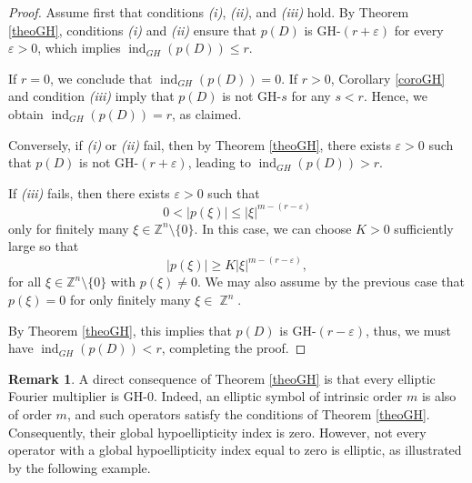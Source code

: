 \documentclass[11pt]{amsart}
\numberwithin{equation}{section}
\theoremstyle{definition}
\newtheorem{remark}[theorem]{Remark}
\DeclareMathOperator{\Z}{\mathbb{Z}}
\begin{document}
	\begin{proof}
		Assume first that conditions {\it (i)}, {\it (ii)}, and {\it (iii)} hold. By Theorem \ref{theoGH}, conditions {\it (i)} and {\it (ii)} ensure that \( p(D) \) is GH-\( (r + \varepsilon) \) for every \( \varepsilon > 0 \), which implies \( \operatorname{ind}_{GH}(p(D)) \leq r \).  
		
		If \( r = 0 \), we conclude that \( \operatorname{ind}_{GH}(p(D)) = 0 \). If \( r > 0 \), Corollary \ref{coroGH} and condition {\it (iii)} imply that \( p(D) \) is not GH-\( s \) for any \( s < r \). Hence, we obtain \( \operatorname{ind}_{GH}(p(D)) = r \), as claimed.  
		
		Conversely,  if {\it (i)} or {\it (ii)} fail, then by Theorem \ref{theoGH}, there exists \( \varepsilon > 0 \) such that \( p(D) \) is not GH-\( (r+\varepsilon) \), leading to \( \operatorname{ind}_{GH}(p(D)) > r \).  
			
		If {\it (iii)} fails, then there exists \( \varepsilon > 0 \) such that  
			\begin{equation*}
				0 < |p(\xi)| \leq |\xi|^{m - (r - \varepsilon)}
			\end{equation*}
			only for finitely many \( \xi \in \mathbb{Z}^n \setminus \{0\} \). In this case, we can choose \( K > 0 \) sufficiently large so that  
			\begin{equation*}
				|p(\xi)| \geq K |\xi|^{m - (r - \varepsilon)},
			\end{equation*}
			for all \( \xi \in \mathbb{Z}^n \setminus \{0\} \) with \( p(\xi) \neq 0 \). We may also assume by the previous case that $p(\xi)=0$ for only finitely many $\xi\in\Z^n$. 
			
			By Theorem \ref{theoGH}, this implies that \( p(D) \) is GH-\( (r-\varepsilon) \),  thus, we must have \( \operatorname{ind}_{GH}(p(D)) < r \), completing the proof.
	\end{proof}
	
	\begin{remark}\label{elliptic_is_GH-0}
		A direct consequence of Theorem \ref{theoGH} is that every elliptic Fourier multiplier is GH-\( 0 \). Indeed, an elliptic symbol of intrinsic order \( m \) is also of order \( m \), and such operators satisfy the conditions of Theorem \ref{theoGH}. Consequently, their global hypoellipticity index is zero. However, not every operator with a global hypoellipticity index equal to zero is elliptic, as illustrated by the following example.
	\end{remark}
	
\end{document}
